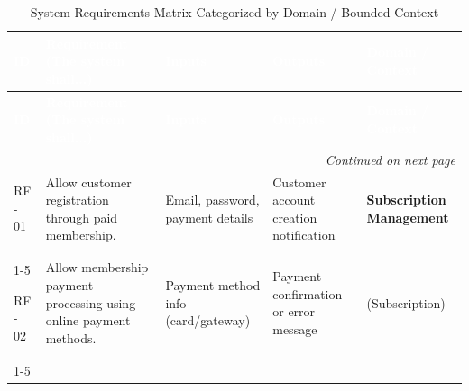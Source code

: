 \documentclass{article}
\begin{document}


\renewcommand{\arraystretch}{1.35}

\begin{longtable}{|p{1.3cm}|p{5.2cm}|p{3.2cm}|p{3.2cm}|p{3.0cm}|}

\caption{System Requirements Matrix Categorized by Domain / Bounded Context}
\label{tab:system_requirements} \\

\hline
\rowcolor[HTML]{1F2937}
\textcolor{white}{\textbf{ID}} &
\textcolor{white}{\textbf{Requirement (The system shall...)}} &
\textcolor{white}{\textbf{Inputs}} &
\textcolor{white}{\textbf{Outputs}} &
\textcolor{white}{\textbf{Domain / Context}} \\
\hline
\endfirsthead

\hline
\rowcolor[HTML]{1F2937}
\textcolor{white}{\textbf{ID}} &
\textcolor{white}{\textbf{Requirement (The system shall...)}} &
\textcolor{white}{\textbf{Inputs}} &
\textcolor{white}{\textbf{Outputs}} &
\textcolor{white}{\textbf{Domain / Context}} \\
\hline
\endhead

\hline
\multicolumn{5}{r}{\textit{Continued on next page}} \\
\endfoot

\hline
\endlastfoot



\rowcolor{pastelSub}
RF - 01 &
Allow customer registration through paid membership. &
Email, password, payment details &
Customer account creation notification &
\textbf{Subscription Management} \\
\cline{1-5}

\rowcolor{pastelSub}
RF - 02 &
Allow membership payment processing using online payment methods. &
Payment method info (card/gateway) &
Payment confirmation or error message &
(Subscription) \\
\cline{1-5}


\end{longtable}
\end{document}
